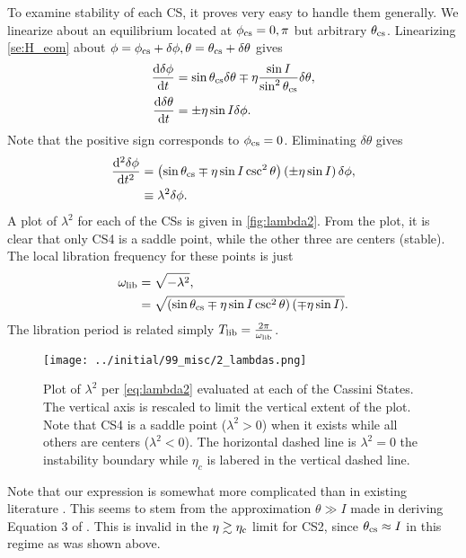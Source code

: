 \documentclass[
        fleqn,
        usenatbib,
        referee,
    ]{mnras}
\newcommand*{\rd}[2]{\frac{\mathrm{d}#1}{\mathrm{d}#2}}
\newcommand*{\rtd}[2]{\frac{\mathrm{d}^2#1}{\mathrm{d}#2^2}}
\newcommand*{\p}[1]{\left(#1\right)}
\begin{document}
To examine stability of each CS, it proves very easy to handle them generally.
We linearize about an equilibrium located at $\phi_{\rm cs} = 0, \pi$ but
arbitrary $\theta_{\rm cs}$. Linearizing \autoref{se:H_eom} about $\phi =
\phi_{\rm cs} + \delta \phi, \theta = \theta_{\rm cs} + \delta \theta$ gives
\begin{subequations}\label{se:H_eom_lin}
    \begin{align}
        \rd{\delta \phi}{t} &= \sin \theta_{\rm cs} \delta \theta
            \mp \eta \frac{\sin I}{\sin^2\theta_{\rm cs}} \delta \theta,\\
        \rd{\delta \theta}{t} &= \pm \eta \sin I \delta \phi.
    \end{align}
\end{subequations}
Note that the positive sign corresponds to $\phi_{\rm cs} = 0$. Eliminating
$\delta \theta$ gives
\begin{align}
    \rtd{\delta \phi}{t} &= \p{\sin \theta_{\rm cs}
        \mp \eta \sin I\csc^2\theta}\p{\pm \eta \sin I} \delta
            \phi,\\
        &\equiv \lambda^2\delta \phi.\label{eq:lambda2}
\end{align}
A plot of $\lambda^2$ for each of the CSs is given in \autoref{fig:lambda2}.
From the plot, it is clear that only CS4 is a saddle point, while the other
three are centers (stable). The local libration frequency for these points is
just
\begin{align}
    \omega_{\rm lib} &= \sqrt{-\lambda^2},\\
        &= \sqrt{\p{\sin \theta_{\rm cs}
            \mp \eta \sin I \csc^2\theta}\p{\mp \eta \sin I}}.
\end{align}
The libration period is related simply $T_{\rm lib} = \frac{2\pi}{\omega_{\rm
lib}}$.
\begin{figure}[t]
    \centering
    \texttt{[image: ../initial/99\_misc/2\_lambdas.png]}
    \caption{Plot of $\lambda^2$ per \autoref{eq:lambda2} evaluated at each
    of the Cassini States. The vertical axis is rescaled to limit the vertical
    extent of the plot. Note that CS4 is a saddle point ($\lambda^2 > 0$) when
    it exists while all others are centers ($\lambda^2 < 0$). The horizontal
    dashed line is $\lambda^2 = 0$ the instability boundary while $\eta_c$ is
    labered in the vertical dashed line.}\label{fig:lambda2}
\end{figure}

Note that our expression is somewhat more complicated than in existing
literature \citep{millholland_disk,ward2004II}. This seems to stem from the
approximation $\theta \gg I$ made in deriving Equation 3 of
\citet{ward2004II}. This is invalid in the $\eta \gtrsim \eta_{\rm c}$ limit for
CS2, since $\theta_{\rm cs} \approx I$ in this regime as was shown above.
\end{document}
